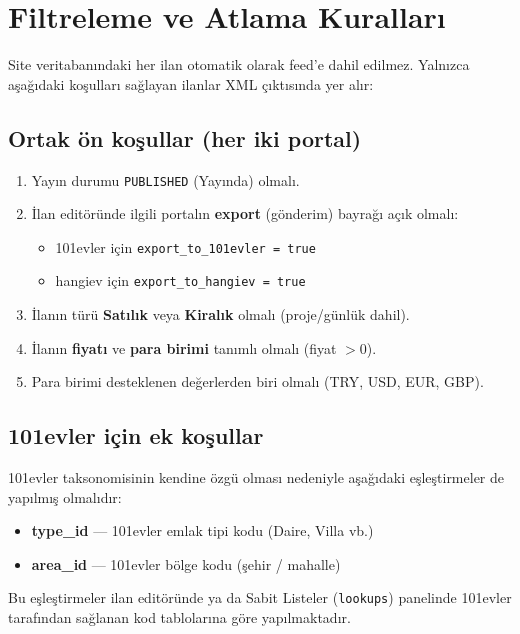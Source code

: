 \documentclass[11pt,a4paper]{article}
\begin{document}
\section{Filtreleme ve Atlama Kuralları}

Site veritabanındaki her ilan otomatik olarak feed'e dahil edilmez. Yalnızca aşağıdaki koşulları sağlayan ilanlar XML çıktısında yer alır:

\subsection{Ortak ön koşullar (her iki portal)}

\begin{enumerate}[leftmargin=*]
\item Yayın durumu \texttt{PUBLISHED} (Yayında) olmalı.
\item İlan editöründe ilgili portalın \textbf{export} (gönderim) bayrağı açık olmalı:
  \begin{itemize}
  \item 101evler için \texttt{export\_to\_101evler = true}
  \item hangiev için \texttt{export\_to\_hangiev = true}
  \end{itemize}
\item İlanın türü \textbf{Satılık} veya \textbf{Kiralık} olmalı (proje/günlük dahil).
\item İlanın \textbf{fiyatı} ve \textbf{para birimi} tanımlı olmalı (fiyat $> 0$).
\item Para birimi desteklenen değerlerden biri olmalı (TRY, USD, EUR, GBP).
\end{enumerate}

\subsection{101evler için ek koşullar}

101evler taksonomisinin kendine özgü olması nedeniyle aşağıdaki eşleştirmeler de yapılmış olmalıdır:

\begin{itemize}[leftmargin=*]
\item \textbf{type\_id} — 101evler emlak tipi kodu (Daire, Villa vb.)
\item \textbf{area\_id} — 101evler bölge kodu (şehir / mahalle)
\end{itemize}

Bu eşleştirmeler ilan editöründe ya da Sabit Listeler (\texttt{lookups}) panelinde 101evler tarafından sağlanan kod tablolarına göre yapılmaktadır.
\end{document}

